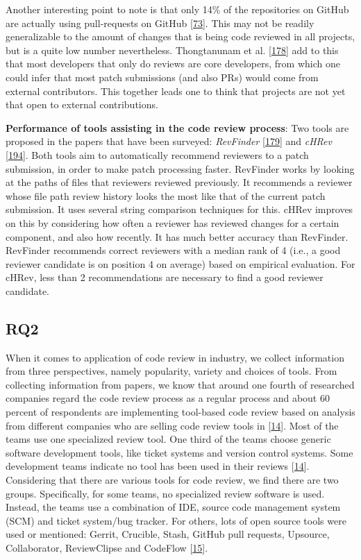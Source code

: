 \documentclass[]{book}
\begin{document}
Another interesting point to note is that only 14\% of the repositories
on GitHub are actually using pull-requests on GitHub
{[}\protect\hyperlink{ref-gousios2014exploratory}{73}{]}. This may not
be readily generalizable to the amount of changes that is being code
reviewed in all projects, but is a quite low number nevertheless.
Thongtanunam et al.
{[}\protect\hyperlink{ref-thongtanunam2016revisiting}{178}{]} add to
this that most developers that only do reviews are core developers, from
which one could infer that most patch submissions (and also PRs) would
come from external contributors. This together leads one to think that
projects are not yet that open to external contributions.

\textbf{Performance of tools assisting in the code review process}: Two
tools are proposed in the papers that have been surveyed:
\emph{RevFinder}
{[}\protect\hyperlink{ref-thongtanunam2015should}{179}{]} and
\emph{cHRev}
{[}\protect\hyperlink{ref-zanjani2016automatically}{194}{]}. Both tools
aim to automatically recommend reviewers to a patch submission, in order
to make patch processing faster. RevFinder works by looking at the paths
of files that reviewers reviewed previously. It recommends a reviewer
whose file path review history looks the most like that of the current
patch submission. It uses several string comparison techniques for this.
cHRev improves on this by considering how often a reviewer has reviewed
changes for a certain component, and also how recently. It has much
better accuracy than RevFinder. RevFinder recommends correct reviewers
with a median rank of 4 (i.e., a good reviewer candidate is on position
4 on average) based on empirical evaluation. For cHRev, less than 2
recommendations are necessary to find a good reviewer candidate.

\subsection{RQ2}\label{rq2}

When it comes to application of code review in industry, we collect
information from three perspectives, namely popularity, variety and
choices of tools. From collecting information from papers, we know that
around one fourth of researched companies regard the code review process
as a regular process and about 60 percent of respondents are
implementing tool-based code review based on analysis from different
companies who are selling code review tools in
{[}\protect\hyperlink{ref-baum2017choice}{14}{]}. Most of the teams use
one specialized review tool. One third of the teams choose generic
software development tools, like ticket systems and version control
systems. Some development teams indicate no tool has been used in their
reviews {[}\protect\hyperlink{ref-baum2017choice}{14}{]}. Considering
that there are various tools for code review, we find there are two
groups. Specifically, for some teams, no specialized review software is
used. Instead, the teams use a combination of IDE, source code
management system (SCM) and ticket system/bug tracker. For others, lots
of open source tools were used or mentioned: Gerrit, Crucible, Stash,
GitHub pull requests, Upsource, Collaborator, ReviewClipse and CodeFlow
{[}\protect\hyperlink{ref-baum2016faceted}{15}{]}.
\end{document}
